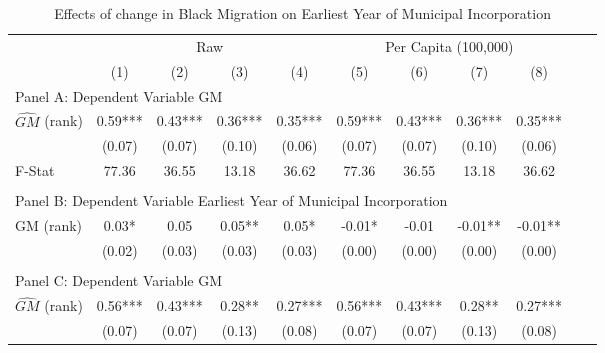  \begin{table}[htbp]\centering {} \begin{threeparttable} \caption{Effects of change in Black Migration on Earliest Year of Municipal Incorporation} \begin{tabular}{l*{10}{c}} \toprule
                &\multicolumn{4}{c}{Raw}                                    &\multicolumn{4}{c}{Per Capita (100,000)}                   \\\cmidrule(lr){2-5}\cmidrule(lr){6-9}
                &\multicolumn{1}{c}{(1)}   &\multicolumn{1}{c}{(2)}   &\multicolumn{1}{c}{(3)}   &\multicolumn{1}{c}{(4)}   &\multicolumn{1}{c}{(5)}   &\multicolumn{1}{c}{(6)}   &\multicolumn{1}{c}{(7)}   &\multicolumn{1}{c}{(8)}   \\
\cmidrule(lr){1-9}
\multicolumn{8}{l}{Panel A: Dependent Variable GM}\\
\cmidrule(lr){1-9}
$\hat{GM}$ (rank)&       0.59***&       0.43***&       0.36***&       0.35***&       0.59***&       0.43***&       0.36***&       0.35***\\
                &     (0.07)   &     (0.07)   &     (0.10)   &     (0.06)   &     (0.07)   &     (0.07)   &     (0.10)   &     (0.06)   \\
\midrule
F-Stat          &      77.36   &      36.55   &      13.18   &      36.62   &      77.36   &      36.55   &      13.18   &      36.62   \\
\cmidrule[\heavyrulewidth](lr){1-9} \\ \cmidrule[\heavyrulewidth](lr){1-9}
\multicolumn{8}{l}{Panel B: Dependent Variable Earliest Year of Municipal Incorporation}\\
\cmidrule(lr){1-9}
GM  (rank)      &       0.03*  &       0.05   &       0.05** &       0.05*  &      -0.01*  &      -0.01   &      -0.01** &      -0.01** \\
                &     (0.02)   &     (0.03)   &     (0.03)   &     (0.03)   &     (0.00)   &     (0.00)   &     (0.00)   &     (0.00)   \\
\cmidrule[\heavyrulewidth](lr){1-9} \\ \cmidrule[\heavyrulewidth](lr){1-9}
\multicolumn{8}{l}{Panel C: Dependent Variable GM}\\
\cmidrule(lr){1-9}
$\hat{GM}$ (rank)&       0.56***&       0.43***&       0.28** &       0.27***&       0.56***&       0.43***&       0.28** &       0.27***\\
                &     (0.07)   &     (0.07)   &     (0.13)   &     (0.08)   &     (0.07)   &     (0.07)   &     (0.13)   &     (0.08)   \\

\end{tabular}
\end{threeparttable}
\end{table}
